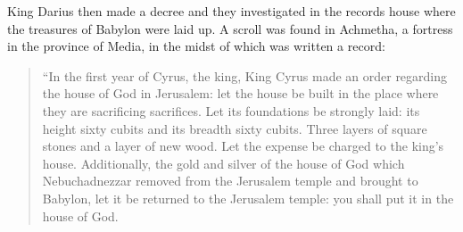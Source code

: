 
\begin{inparaenum}
   King Darius then made a decree and they investigated in the records house where the treasures of Babylon were laid up.%
   A scroll was found in Achmetha, a fortress in the province of Media, in the midst of which was written a record:%
\end{inparaenum}

\begin{quotation}
  \begin{inparaenum}\setcounter{enumi}{2}
     ``In the first year of Cyrus, the king, King Cyrus made an order regarding the house of God in Jerusalem: let the house be built in the place where they are sacrificing sacrifices. Let its foundations be strongly laid: its height sixty cubits and its breadth sixty cubits.%
     Three layers of square stones and a layer of new wood. Let the expense be charged to the king's house.%
     Additionally, the gold and silver of the house of God which Nebuchadnezzar removed from the Jerusalem temple and brought to Babylon, let it be returned to the Jerusalem temple: you shall put it in the house of God.%
    

\end{inparaenum}
\end{quotation}
